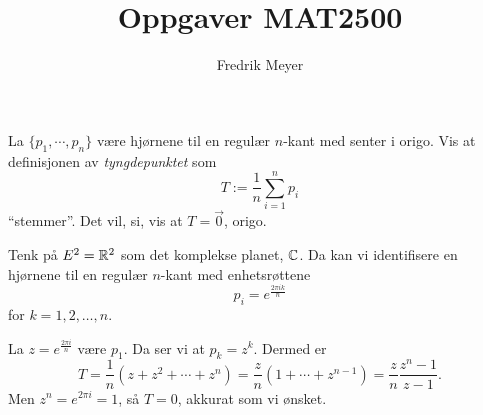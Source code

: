 \documentclass[11pt, norsk]{article}
\begin{document}
\title{Oppgaver MAT2500}
\author{Fredrik Meyer}
\maketitle 

\begin{oppg}
La $\{p_1,\cdots,p_n\}$ være hjørnene til en regulær $n$-kant med senter i origo. Vis at definisjonen av \emph{tyngdepunktet} som 
$$T := \frac 1n \sum_{i=1}^n p_i $$
``stemmer''. Det vil, si, vis at $T= \vec 0$, origo.
\end{oppg}
\begin{losn}
Tenk på $E^2=\mathbb{R}^2$ som det komplekse planet, $\mathbb{C}$. Da kan vi identifisere en hjørnene til en regulær $n$-kant med enhetsrøttene $$p_i = e^{\frac{2\pi i k}{n}}$$ for $k=1,2,\ldots,n$.

La $z = e^{\frac{2 \pi i}{n}}$ være $p_1$. Da ser vi at $p_k=z^k$. Dermed er
\[
T = \frac 1n \left( z+z^2+\cdots+z^n \right) = \frac zn (1 + \cdots + z^{n-1}) = \frac zn \frac {z^n-1}{z-1}.
\]
Men $z^n = e^{2\pi i}=1$, så $T=0$, akkurat som vi ønsket.
\end{losn}
\end{document}
